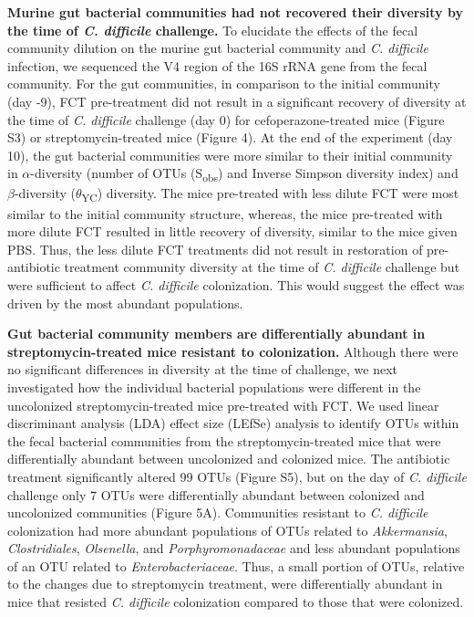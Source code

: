 \documentclass[
  12pt,
]{article}
\begin{document}
\textbf{Murine gut bacterial communities had not recovered their
diversity by the time of \emph{C. difficile} challenge.} To elucidate
the effects of the fecal community dilution on the murine gut bacterial
community and \emph{C. difficile} infection, we sequenced the V4 region
of the 16S rRNA gene from the fecal community. For the gut communities,
in comparison to the initial community (day -9), FCT pre-treatment did
not result in a significant recovery of diversity at the time of
\emph{C. difficile} challenge (day 0) for cefoperazone-treated mice
(Figure S3) or streptomycin-treated mice (Figure 4). At the end of the
experiment (day 10), the gut bacterial communities were more similar to
their initial community in \(\alpha\)-diversity (number of OTUs
(S\textsubscript{obs}) and Inverse Simpson diversity index) and
\(\beta\)-diversity (\(\theta\)\textsubscript{YC}) diversity. The mice
pre-treated with less dilute FCT were most similar to the initial
community structure, whereas, the mice pre-treated with more dilute FCT
resulted in little recovery of diversity, similar to the mice given PBS.
Thus, the less dilute FCT treatments did not result in restoration of
pre-antibiotic treatment community diversity at the time of \emph{C.
difficile} challenge but were sufficient to affect \emph{C. difficile}
colonization. This would suggest the effect was driven by the most
abundant populations.

\textbf{Gut bacterial community members are differentially abundant in
streptomycin-treated mice resistant to colonization.} Although there
were no significant differences in diversity at the time of challenge,
we next investigated how the individual bacterial populations were
different in the uncolonized streptomycin-treated mice pre-treated with
FCT. We used linear discriminant analysis (LDA) effect size (LEfSe)
analysis to identify OTUs within the fecal bacterial communities from
the streptomycin-treated mice that were differentially abundant between
uncolonized and colonized mice. The antibiotic treatment significantly
altered 99 OTUs (Figure S5), but on the day of \emph{C. difficile}
challenge only 7 OTUs were differentially abundant between colonized and
uncolonized communities (Figure 5A). Communities resistant to \emph{C.
difficile} colonization had more abundant populations of OTUs related to
\emph{Akkermansia}, \emph{Clostridiales}, \emph{Olsenella}, and
\emph{Porphyromonadaceae} and less abundant populations of an OTU
related to \emph{Enterobacteriaceae}. Thus, a small portion of OTUs,
relative to the changes due to streptomycin treatment, were
differentially abundant in mice that resisted \emph{C. difficile}
colonization compared to those that were colonized.
\end{document}
